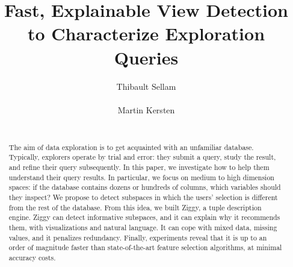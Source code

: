 \documentclass{vldb}
\begin{document}
\title{Fast, Explainable View Detection\\ to Characterize Exploration Queries}

\author{
\alignauthor
Thibault Sellam\\
       \\
\alignauthor
Martin Kersten\\
       \\
}

\maketitle

\begin{abstract} 
The aim of data exploration is to get acquainted with an unfamiliar
database.  Typically, explorers operate by trial and error: they submit a
query, study the result, and refine their query subsequently. In this
paper, we investigate how to help them understand their query results.  In
particular, we focus on medium to high dimension spaces: if the database
contains dozens or hundreds of columns, which variables should they
inspect? We propose to detect subspaces in which the users' selection is
different  from the rest of the database. From this idea, we built Ziggy, a
tuple description engine.  Ziggy can detect informative subspaces, and it
can explain why it recommends them, with visualizations and natural
language.  It can cope with mixed data, missing values, and it penalizes
redundancy. Finally, expe\-riments reveal that it is up to
an order of magnitude faster than state-of-the-art feature selection
algorithms, at minimal accuracy costs.
\end{abstract}







\balance

\end{document}
